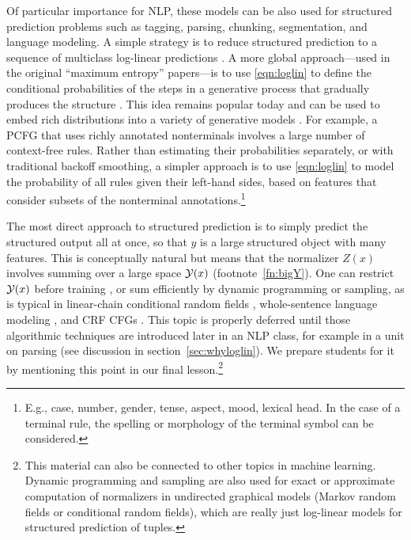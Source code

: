 \documentclass[11pt,letterpaper]{article}
\begin{document}
Of particular importance for NLP, these models can be also used for
structured prediction problems such as tagging, parsing, chunking,
segmentation, and language modeling.  A simple strategy is to reduce
structured prediction to a sequence of multiclass log-linear
predictions \cite{ratnaparkhi-1998}.  A more global approach---used in
the original ``maximum entropy'' papers---is to use \eqref{eqn:loglin}
to define the conditional probabilities of the steps in a generative
process that gradually produces the structure
\cite{rosenfeld-1994,berger-dellapietra-dellapietra-1996}.  This idea
remains popular today and can be used to embed rich distributions
into a variety of generative models \cite{bergkirkpatrick-et-al-2010}.
For example, a PCFG that uses richly annotated nonterminals involves a
large number of context-free rules.  Rather than estimating their
probabilities separately, or with traditional backoff smoothing, a
simpler approach is to use \eqref{eqn:loglin} to model the probability
of all rules given their left-hand sides, based on features that
consider subsets of the nonterminal annotations.\footnote{E.g., case,
  number, gender, tense, aspect, mood, lexical head.  In the case of a
  terminal rule, the spelling or morphology of the terminal symbol can
  be considered.}  

The most direct approach to structured prediction is to simply predict
the structured output all at once, so that $y$ is a large structured
object with many features.  This is conceptually natural but means
that the normalizer $Z(x)$ involves summing over a large space ${\cal
  Y}(x)$ (footnote~\ref{fn:bigY}).  One can restrict ${\cal Y}(x)$
before training \cite{johnson-et-al-1999}, or sum efficiently by
dynamic programming or sampling, as is typical in linear-chain
conditional random fields \cite{lafferty-mccallum-pereira-2001},
whole-sentence language modeling \cite{rosenfeld-chen-zhu-2001}, and
CRF CFGs \cite{finkel2008efficient}.  This topic is properly deferred
until those algorithmic techniques are introduced later in an NLP
class, for example in a unit on parsing (see discussion in
section~\ref{sec:whyloglin}).  We prepare students for it by
mentioning this point in our final lesson.\footnote{This material can
  also be connected to other topics in machine learning.  Dynamic
  programming and sampling are also used for exact or approximate
  computation of normalizers in undirected graphical models (Markov
  random fields or conditional random fields), which are really just
  log-linear models for structured prediction of tuples.}
\end{document}
